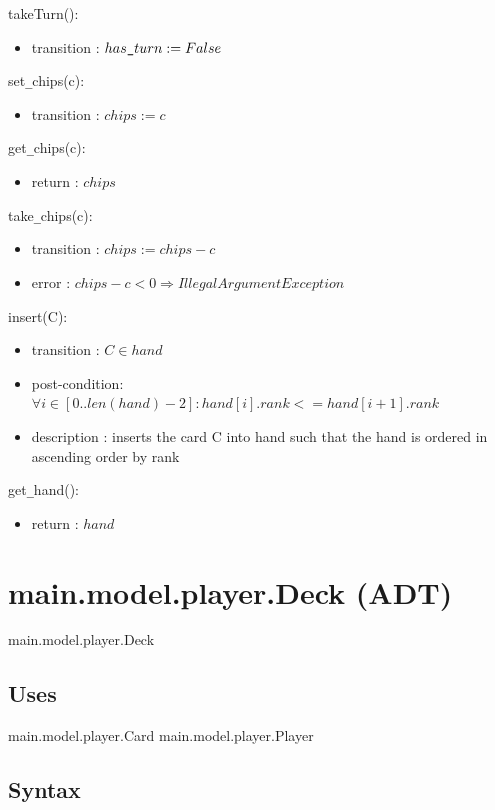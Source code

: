 \documentclass[12pt, titlepage]{article}
\begin{document}
\noindent takeTurn():
\begin{itemize}
\item transition : $has\verb|_|turn := False$ 
\end{itemize}

\noindent set\verb|_|chips(c):
\begin{itemize}
\item transition : $chips := c$ 
\end{itemize}

\noindent get\verb|_|chips(c):
\begin{itemize}
\item return : $chips$ 
\end{itemize}

\noindent take\verb|_|chips(c):
\begin{itemize}
\item transition : $chips := chips - c$
\item error : $chips - c < 0 \Longrightarrow IllegalArgumentException$
\end{itemize}

\noindent insert(C):
\begin{itemize}
\item transition : $C \in hand$
\item post-condition: $\forall i \in [0..len(hand) - 2] : hand[i].rank <= hand[i+1].rank$ 
\item description : inserts the card C into hand such that the hand is ordered in ascending order by rank
\end{itemize}

\noindent get\verb|_|hand():
\begin{itemize}
\item return : $hand$ 
\end{itemize}

\section* {main.model.player.Deck (ADT)}

main.model.player.Deck

\subsection* {Uses}

main.model.player.Card
main.model.player.Player

\subsection* {Syntax}
\end{document}
